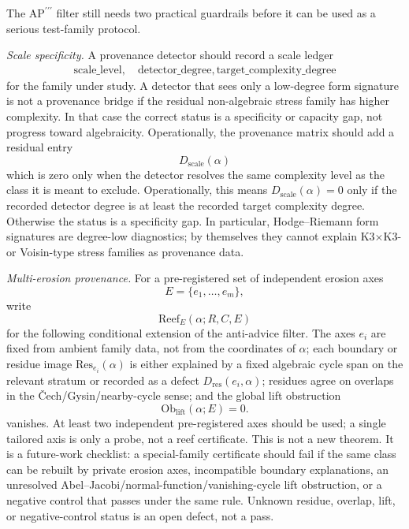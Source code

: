 \documentclass[aps,prd,twocolumn,superscriptaddress,nofootinbib]{revtex4-2}
\theoremstyle{definition}
\theoremstyle{remark}
\def\\{ }%
\begin{document}
The $\mathrm{AP}^{\prime\prime\prime}$ filter still needs two practical guardrails before it can be used as a serious test-family protocol.

\emph{Scale specificity.} A provenance detector should record a scale ledger
\[
\begin{gathered}
\mathrm{scale\_level},\quad \mathrm{detector\_degree},\\
\mathrm{target\_complexity\_degree}
\end{gathered}
\]
for the family under study. A detector that sees only a low-degree form signature is not a provenance bridge if the residual non-algebraic stress family has higher complexity. In that case the correct status is a specificity or capacity gap, not progress toward algebraicity. Operationally, the provenance matrix should add a residual entry
\[
D_{\mathrm{scale}}(\alpha)
\]
which is zero only when the detector resolves the same complexity level as the class it is meant to exclude.
Operationally, this means $D_{\mathrm{scale}}(\alpha)=0$ only if the recorded detector degree is at least the recorded target complexity degree. Otherwise the status is a specificity gap. In particular, Hodge--Riemann form signatures are degree-low diagnostics; by themselves they cannot explain K3$\times$K3- or Voisin-type stress families as provenance data.

\emph{Multi-erosion provenance.} For a pre-registered set of independent erosion axes
\[
E=\{e_1,\ldots,e_m\},
\]
write
\[
\mathrm{Reef}_{E}(\alpha;R,C,E)
\]
for the following conditional extension of the anti-advice filter. The axes $e_i$ are fixed from ambient family data, not from the coordinates of $\alpha$; each boundary or residue image $\mathrm{Res}_{e_i}(\alpha)$ is either explained by a fixed algebraic cycle span on the relevant stratum or recorded as a defect $D_{\mathrm{res}}(e_i,\alpha)$; residues agree on overlaps in the \v{C}ech/Gysin/nearby-cycle sense; and the global lift obstruction
\[
\mathrm{Ob}_{\mathrm{lift}}(\alpha;E)=0.
\]
vanishes. At least two independent pre-registered axes should be used; a single tailored axis is only a probe, not a reef certificate. This is not a new theorem. It is a future-work checklist: a special-family certificate should fail if the same class can be rebuilt by private erosion axes, incompatible boundary explanations, an unresolved Abel--Jacobi/normal-function/vanishing-cycle lift obstruction, or a negative control that passes under the same rule. Unknown residue, overlap, lift, or negative-control status is an open defect, not a pass.
\end{document}
